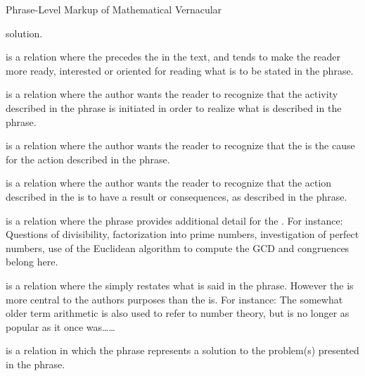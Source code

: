 \begin{module}[id=mtext]
\begin{omgroup}[id=mtext,short=Mathematical Text]
\begin{omgroup}[id=phrases]{Phrase-Level Markup of Mathematical Vernacular}
\begin{description}
  solution.
\item[{\attval[ns-elt=h]{preparation}{relation}{span}}] is a relation where the
  {} precedes the {} in the
  text, and tends to make the reader more ready, interested or oriented for reading what
  is to be stated in the {} phrase.
\item[{\attval[ns-elt=h]{purpose}{relation}{span}}] is a relation where the author wants the
  reader to recognize that the activity described in the {}
  phrase is initiated in order to realize what is described in the
  {} phrase.
\item[{\attval[ns-elt=h]{cause}{relation}{span}}] is a relation where the author wants the reader
  to recognize that the {} is the cause for the action
  described in the {} phrase.
\item[{\attval[ns-elt=h]{consequence}{relation}{span}}] is a relation where the author wants the
  reader to recognize that the action described in the {} is
  to have a result or consequences, as described in the {}
  phrase.
\item[{\attval[ns-elt=h]{elaboration}{relation}{span}}] is a relation where the
  {} phrase provides additional detail for the
  {}.  For instance: {}
  Questions of divisibility, factorization into prime numbers, investigation of perfect
  numbers, use of the Euclidean algorithm to compute the GCD and congruences belong here.
\item[{\attval[ns-elt=h]{restatement}{relation}{span}}] is a relation where the
  {} simply restates what is said in the
  {} phrase. However the {} is
  more central to the authors purposes than the {} is.
  For instance: The somewhat older term arithmetic is also used to refer to number theory,
  but is no longer as popular as it once was\ldots \ldots {}
\item[{\attval[ns-elt=h]{solutionhood}{relation}{span}}] is a relation in which the
  {} phrase represents a solution to the problem(s)
  presented in the {} phrase.
\end{description}


\end{omgroup}
\end{omgroup}
\end{module}
